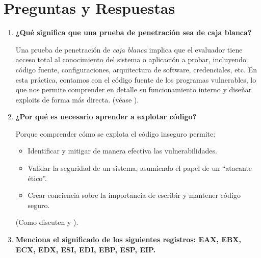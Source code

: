 \section{Preguntas y Respuestas}

\begin{enumerate}

    \item \textbf{¿Qué significa que una prueba de penetración sea de caja blanca?}

    Una prueba de penetración de \textit{caja blanca} implica que el evaluador tiene acceso total
    al conocimiento del sistema o aplicación a probar, incluyendo código fuente, configuraciones,
    arquitectura de software, credenciales, etc. En esta práctica, contamos con el código fuente de
    los programas vulnerables, lo que nos permite comprender en detalle su funcionamiento interno
    y diseñar exploits de forma más directa. (véase \citep{cowan2002}).

    \item \textbf{¿Por qué es necesario aprender a explotar código?}

    Porque comprender cómo se explota el código inseguro permite:
    \begin{itemize}
        \item Identificar y mitigar de manera efectiva las vulnerabilidades.
        \item Validar la seguridad de un sistema, asumiendo el papel de un “atacante ético”.
        \item Crear conciencia sobre la importancia de escribir y mantener código seguro.
    \end{itemize}

    (Como discuten \citet{erickson2008} y \citet{howard2003}).

    \item \textbf{Menciona el significado de los siguientes registros: EAX, EBX, ECX, EDX, ESI, EDI, EBP, ESP, EIP.}


\end{enumerate}
